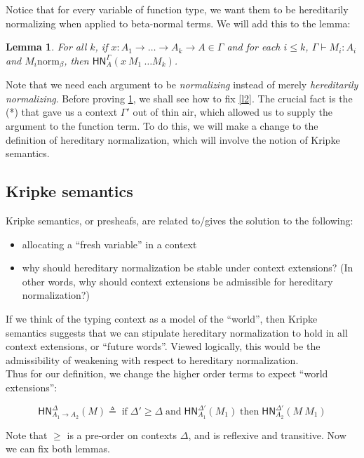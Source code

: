 \documentclass{article}
\newtheorem{lem}[thm]{Lemma}
\newcommand{\hasEF}[3]{\ensuremath{#1 \vdash #2 : #3}}
\newcommand{\bnorm}[1]{#1 \mathrel{\text{norm}_\beta}}
\newcommand{\hnorm}[3]{\ensuremath{\mathsf{HN}^{#1}_{#2}(#3)}}
\newcommand{\fn}[2]{\ensuremath{#1 \to #2}}
\newcommand{\ap}[2]{\ensuremath{#1\ #2}}
\begin{document}
Notice that for every variable of function type, we want them to be hereditarily normalizing when applied to 
beta-normal terms. We will add this to the lemma:

\begin{lem}\label{l4}
For all $k$, if $x : A_1 \to \dots \to A_k \to A \in \Gamma$ and for each $i \le k$, $\hasEF{\Gamma}{M_i}{A_i}$ and $\bnorm{M_i}$, then $\hnorm{\Gamma}{A}{\ap{\ap{x}{M_1}}{\dots M_k}}$.
\end{lem}

Note that we need each argument to be \emph{normalizing} instead of merely \emph{hereditarily normalizing}. 
Before proving \ref{l4}, we shall see how to fix \ref{l2}. The crucial fact is the (*) that gave us a context $\Gamma'$
out of thin air, which allowed us to supply the argument to the function term. To do this, we will make a change to 
the definition of hereditary normalization, which will involve the notion of Kripke semantics.

\subsection{Kripke semantics}

Kripke semantics, or presheafs, are related to/gives the solution to the following:
\begin{itemize}
\item allocating a ``fresh variable'' in a context
\item why should hereditary normalization be stable under context extensions? (In other words, why should context
extensions be admissible for hereditary normalization?)
\end{itemize}

If we think of the typing context as a model of the ``world'', then Kripke semantics suggests that we can stipulate
hereditary normalization to hold in all context extensions, or ``future words''. Viewed logically, this would be the
admissibility of weakening with respect to hereditary normalization.\\

Thus for our definition, we change the higher order terms to expect ``world extensions'':

\[
\hnorm{\Delta}{\fn{A_1}{A_2}}{M} \triangleq \;\text{if}\; \Delta' \ge \Delta \;\text{and}\; \hnorm{\Delta'}{A_1}{M_1}
\;\text{then}\; \hnorm{\Delta'}{A_2}{\ap{M}{M_1}}
\]

Note that $\ge$ is a pre-order on contexts $\Delta$, and is reflexive and transitive. Now we can fix both lemmas. 
\end{document}
